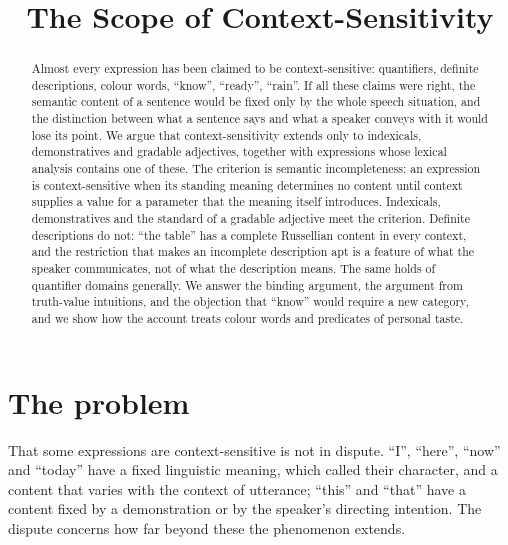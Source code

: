 \documentclass{situationist-preprint}
\title{The Scope of Context-Sensitivity}
\begin{document}
\maketitle

\begin{abstract}
Almost every expression has been claimed to be context-sensitive: quantifiers, definite descriptions, colour words, \enquote{know}, \enquote{ready}, \enquote{rain}. If all these claims were right, the semantic content of a sentence would be fixed only by the whole speech situation, and the distinction between what a sentence says and what a speaker conveys with it would lose its point. We argue that context-sensitivity extends only to indexicals, demonstratives and gradable adjectives, together with expressions whose lexical analysis contains one of these. The criterion is semantic incompleteness: an expression is context-sensitive when its standing meaning determines no content until context supplies a value for a parameter that the meaning itself introduces. Indexicals, demonstratives and the standard of a gradable adjective meet the criterion. Definite descriptions do not: \enquote{the table} has a complete Russellian content in every context, and the restriction that makes an incomplete description apt is a feature of what the speaker communicates, not of what the description means. The same holds of quantifier domains generally. We answer the binding argument, the argument from truth-value intuitions, and the objection that \enquote{know} would require a new category, and we show how the account treats colour words and predicates of personal taste.
\end{abstract}

\section{The problem}

That some expressions are context-sensitive is not in dispute. \enquote{I}, \enquote{here}, \enquote{now} and \enquote{today} have a fixed linguistic meaning, which \citet{Kaplan1989} called their character, and a content that varies with the context of utterance; \enquote{this} and \enquote{that} have a content fixed by a demonstration or by the speaker's directing intention. The dispute concerns how far beyond these the phenomenon extends.
\end{document}
